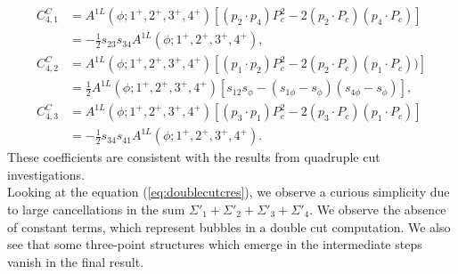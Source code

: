 \begin{align*}
	C^C_{4,1}&=A^{1L}(\phi;1^+,2^+,3^+,4^+)\left[(p_2\cdot p_4)P_c^2-2(p_2\cdot P_c)(p_4\cdot P_c) \right]\\
	&=-\frac{1}{2}s_{23}s_{34}A^{1L}(\phi;1^+,2^+,3^+,4^+),\\
	C^C_{4,2}&=A^{1L}(\phi;1^+,2^+,3^+,4^+)\left[(p_1\cdot p_2)P_c^2-2(p_2\cdot P_c)(p_1\cdot P_c))\right]\\
	&=\frac{1}{2}A^{1L}(\phi;1^+,2^+,3^+,4^+)\left[s_{12}s_\phi-(s_{1\phi}-s_{\phi})(s_{4\phi}-s_\phi)\right],\\
	C^C_{4,3}&=A^{1L}(\phi;1^+,2^+,3^+,4^+)\left[(p_3\cdot p_1)P_c^2-2(p_3\cdot P_c)(p_1\cdot P_c) \right]\\
	&=-\frac{1}{2}s_{34}s_{41}A^{1L}(\phi;1^+,2^+,3^+,4^+).
\end{align*}
These coefficients are consistent with the results from quadruple cut investigations.\\
Looking at the equation (\ref{eq:doublecutcres}), we observe a curious simplicity due to large cancellations in the sum $\Sigma'_1+\Sigma'_2+\Sigma'_3+\Sigma'_4$. We observe the absence of constant terms, which represent bubbles in a double cut computation. We also see that some three-point structures which emerge in the intermediate steps vanish in the final result.
